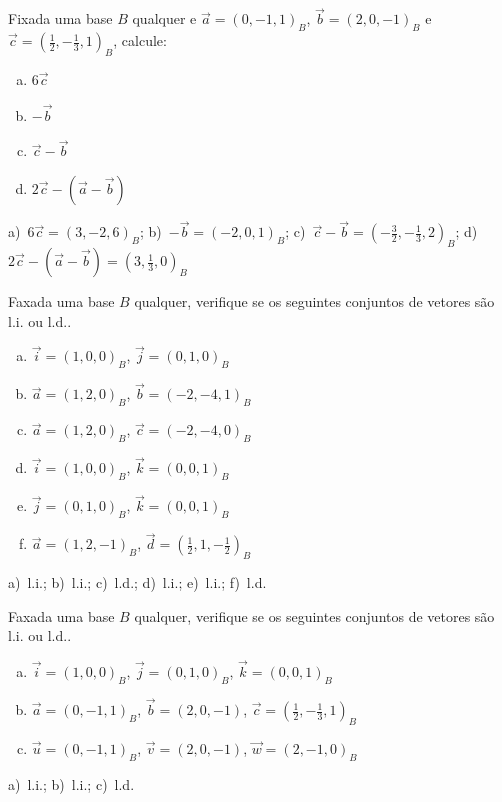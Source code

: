 \begin{exer}
  Fixada uma base $B$ qualquer e $\vec{a}=\left(0,-1,1\right)_B$, $\vec{b}=\left(2,0,-1\right)_B$ e $\vec{c}=\left(\frac{1}{2},-\frac{1}{3},1\right)_B$, calcule:
  \begin{enumerate}[a)]
  \item $6\vec{c}$
  \item $-\vec{b}$
  \item $\vec{c}-\vec{b}$
  \item $2\vec{c}-(\vec{a}-\vec{b})$
  \end{enumerate}
\end{exer}
\begin{resp}
  a)~$6\vec{c}=(3,-2,6)_B$; b)~$-\vec{b}=(-2,0,1)_B$; c)~$\vec{c}-\vec{b}=(-\frac{3}{2},-\frac{1}{3},2)_B$; d)~$2\vec{c}-(\vec{a}-\vec{b})=(3,\frac{1}{3},0)_B$
\end{resp}

\begin{exer}
  Faxada uma base $B$ qualquer, verifique se os seguintes conjuntos de vetores são l.i. ou l.d..
  \begin{enumerate}[a)]
  \item $\vec{i}=(1,0,0)_B$, $\vec{j}=(0,1,0)_B$
  \item $\vec{a}=(1,2,0)_B$, $\vec{b}=(-2,-4,1)_B$
  \item $\vec{a}=(1,2,0)_B$, $\vec{c}=(-2,-4,0)_B$
  \item $\vec{i}=(1,0,0)_B$, $\vec{k}=(0,0,1)_B$
  \item $\vec{j}=(0,1,0)_B$, $\vec{k}=(0,0,1)_B$
  \item $\vec{a}=(1,2,-1)_B$, $\vec{d}=(\frac{1}{2},1,-\frac{1}{2})_B$
  \end{enumerate}
\end{exer}
\begin{resp}
  a)~l.i.; b)~l.i.; c)~l.d.; d)~l.i.; e)~l.i.; f)~l.d.
\end{resp}

\begin{exer}
  Faxada uma base $B$ qualquer, verifique se os seguintes conjuntos de vetores são l.i. ou l.d..
  \begin{enumerate}[a)]
  \item $\vec{i}=(1,0,0)_B$, $\vec{j}=(0,1,0)_B$, $\vec{k}=(0,0,1)_B$
  \item $\vec{a}=(0,-1,1)_B$, $\vec{b}=(2,0,-1)$, $\vec{c}=(\frac{1}{2},-\frac{1}{3},1)_B$
  \item $\vec{u}=(0,-1,1)_B$, $\vec{v}=(2,0,-1)$, $\vec{w}=(2,-1,0)_B$
  \end{enumerate}
\end{exer}
\begin{resp}
  a)~l.i.; b)~l.i.; c)~l.d.
\end{resp}

